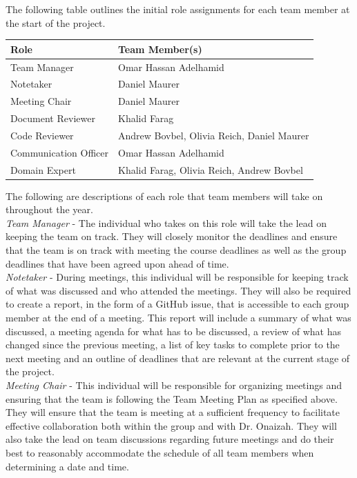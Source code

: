 \documentclass{article}
\begin{document}
The following table outlines the initial role assignments for each team member at the start of the project.

\begin{center}
\begin{tabularx}{\textwidth}{lX}
  \toprule
  \textbf{Role} & \textbf{Team Member(s)} \\
  \midrule
  Team Manager        & Omar Hassan Adelhamid \\
  Notetaker           & Daniel Maurer \\
  Meeting Chair       & Daniel Maurer \\
  Document Reviewer   & Khalid Farag \\
  Code Reviewer       & Andrew Bovbel, Olivia Reich, Daniel Maurer \\
  Communication Officer & Omar Hassan Adelhamid \\
  Domain Expert       & Khalid Farag, Olivia Reich, Andrew Bovbel \\
  \bottomrule
\end{tabularx}
\end{center}

The following are descriptions of each role that team members will take on throughout the year.\\

\textit{Team Manager} - The individual who takes on this role will take the lead on keeping the team on track. They
will closely monitor the deadlines and ensure that the team is on track with meeting the course deadlines as well as
the group deadlines that have been agreed upon ahead of time.\\

\textit{Notetaker} - During meetings, this individual will be responsible for keeping track of what was discussed
and who attended the meetings. They will also be required to create a report, in the form of a GitHub issue, that is accessible to each group member
at the end of a meeting. This report will include a summary of what was discussed, a meeting agenda for what has to
be discussed, a review of what has changed since the previous meeting, a list of key tasks to complete prior to the
next meeting and an outline of deadlines that are relevant at the current stage of the project.\\

\textit{Meeting Chair} - This individual will be responsible for organizing meetings and ensuring that the team is
following the Team Meeting Plan as specified above. They will ensure that the team is meeting at a sufficient
frequency to facilitate effective collaboration both within the group and with Dr. Onaizah. They will also take
the lead on team discussions regarding future meetings and do their best to reasonably accommodate the schedule of
all team members when determining a date and time.\\
\end{document}
